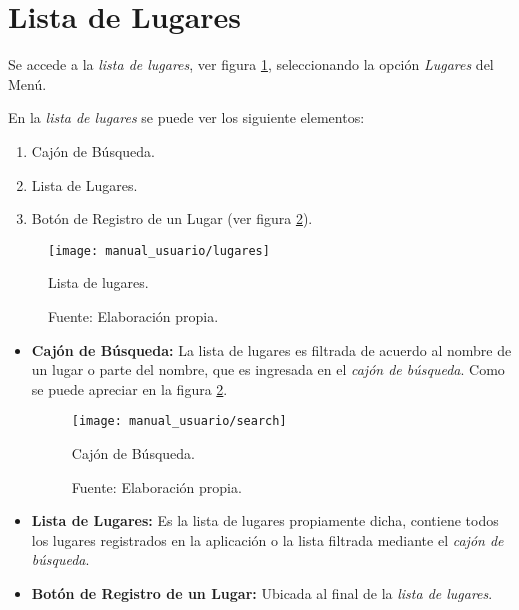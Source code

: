 \section{Lista de Lugares}

Se accede a la \emph{lista de lugares}, ver figura \ref{fig:vista_lugares}, seleccionando la opción \emph{Lugares} del Menú.

En la \emph{lista de lugares} se puede ver los siguiente elementos:

\begin{enumerate}
  \item Cajón de Búsqueda.
  \item Lista de Lugares.
  \item Botón de Registro de un Lugar (ver figura \ref{fig:vista_search}).
\end{enumerate}

\begin{figure}[H]
      \begin{center}
        \texttt{[image: manual\_usuario/lugares]}

        \caption{Lista de lugares.}
        \label{fig:vista_lugares}
        \caption*{Fuente: Elaboración propia.}
      \end{center}
\end{figure}

\begin{itemize}
  \item \textbf{Cajón de Búsqueda:} La lista de lugares es filtrada de acuerdo al nombre de un lugar o parte del nombre, que es ingresada en el \emph{cajón de búsqueda}. Como se puede apreciar en la figura \ref{fig:vista_search}.

  \begin{figure}[H]
        \begin{center}
          \texttt{[image: manual\_usuario/search]}

          \caption{Cajón de Búsqueda.}
          \label{fig:vista_search}
          \caption*{Fuente: Elaboración propia.}
        \end{center}
  \end{figure}

  \item \textbf{Lista de Lugares:} Es la lista de lugares propiamente dicha, contiene todos los lugares registrados en la aplicación o la lista filtrada mediante el \emph{cajón de búsqueda}.

\item \textbf{Botón de Registro de un Lugar:} Ubicada al final de la \emph{lista de lugares}.

\end{itemize}


